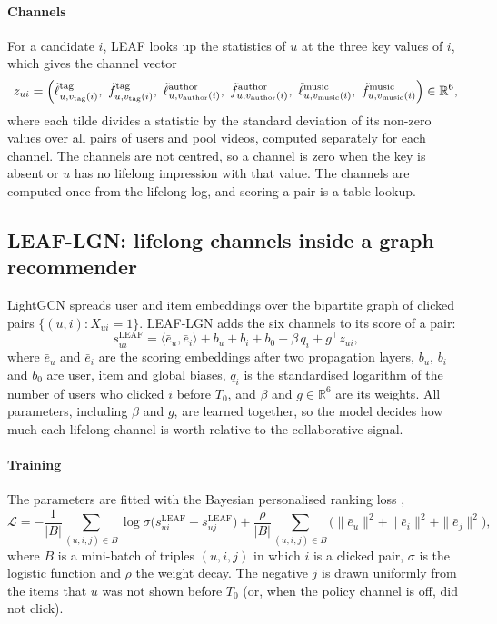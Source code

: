 \documentclass[preprint,12pt,authoryear]{elsarticle}
\begin{document}
\paragraph{Channels} For a candidate $i$, LEAF looks up the statistics of $u$ at the three key values of $i$, which gives the channel vector
\begin{equation}
  z_{ui}=\Bigl(\tilde\ell^{\mathrm{tag}}_{u,v_{\mathrm{tag}}(i)},\ \tilde f^{\mathrm{tag}}_{u,v_{\mathrm{tag}}(i)},\
  \tilde\ell^{\mathrm{author}}_{u,v_{\mathrm{author}}(i)},\ \tilde f^{\mathrm{author}}_{u,v_{\mathrm{author}}(i)},\
  \tilde\ell^{\mathrm{music}}_{u,v_{\mathrm{music}}(i)},\ \tilde f^{\mathrm{music}}_{u,v_{\mathrm{music}}(i)}\Bigr)\in\mathbb R^6,
  \label{eq:channels}
\end{equation}
where each tilde divides a statistic by the standard deviation of its non-zero values over all pairs of users and pool videos, computed
separately for each channel. The channels are not centred, so a channel is zero when the key is absent or $u$ has no lifelong impression
with that value. The channels are computed once from the lifelong log, and scoring a pair is a table lookup.

\subsection{LEAF-LGN: lifelong channels inside a graph recommender}
\label{sec:method-leaflgn}

LightGCN \citep{he2020lightgcn} spreads user and item embeddings over the bipartite graph of clicked pairs $\{(u,i):X_{ui}=1\}$. LEAF-LGN adds
the six channels to its score of a pair:
\begin{equation}
  s^{\mathrm{LEAF}}_{ui}=\langle\bar e_u,\bar e_i\rangle+b_u+b_i+b_0+\beta\,q_i+g^{\top}z_{ui},
  \label{eq:leaflgn}
\end{equation}
where $\bar e_u$ and $\bar e_i$ are the scoring embeddings after two propagation layers, $b_u$, $b_i$ and $b_0$ are user, item and global
biases, $q_i$ is the standardised logarithm of the number of users who clicked $i$ before $T_0$, and $\beta$ and $g\in\mathbb R^6$ are its
weights. All parameters, including $\beta$ and $g$, are learned together, so the model decides how much each lifelong channel is worth
relative to the collaborative signal.

\paragraph{Training} The parameters are fitted with the Bayesian personalised ranking loss \citep{rendle2009bpr},
\begin{equation}
  \mathcal L=-\frac{1}{|B|}\sum_{(u,i,j)\in B}\log\sigma\bigl(s^{\mathrm{LEAF}}_{ui}-s^{\mathrm{LEAF}}_{uj}\bigr)
  +\frac{\rho}{|B|}\sum_{(u,i,j)\in B}\bigl(\|\bar e_u\|^2+\|\bar e_i\|^2+\|\bar e_j\|^2\bigr),
  \label{eq:bpr}
\end{equation}
where $B$ is a mini-batch of triples $(u,i,j)$ in which $i$ is a clicked pair, $\sigma$ is the logistic function and $\rho$ the weight
decay. The negative $j$ is drawn uniformly from the items that $u$ was not shown before $T_0$ (or, when the policy channel is off, did not click).
\end{document}
